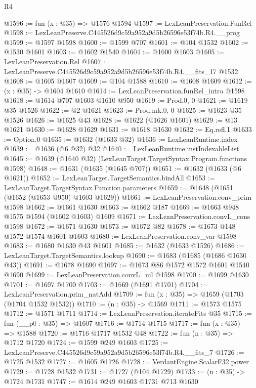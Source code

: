 \begin{lexlean}{R4}
\begin{coremodule}
@1596 := fun (x : @35) => @1576 @1594
@1597 := LexLeanPreservation.FunRel
@1598 := LexLeanPreserve.C445526d9c59a952a9d5b26596e53f74b.R4.__prog
@1599 := @1597 @1598
@1600 := @1599 @707
@1601 := @104 @1532
@1602 := @1530 @1601
@1603 := @1602 @1540
@1604 := @1600 @1603
@1605 := LexLeanPreservation.Rel
@1607 := LexLeanPreserve.C445526d9c59a952a9d5b26596e53f74b.R4.__fits_17 @1532
@1608 := @1605 @1607
@1609 := @104 @1588
@1610 := @1608 @1609
@1612 := (x : @35) -> @1604 @1610
@1614 := LexLeanPreservation.funRel_intro @1598
@1618 := @1614 @707 @1603 @1610 @950
@1619 := Prod.{0, 0}
@1621 := @1619 @35 @1526
@1622 := @2 @1621
@1623 := Prod.mk.{0, 0}
@1625 := @1623 @35 @1526
@1626 := @1625 @43
@1628 := @1622 (@1626 @1601)
@1629 := @13 @1621
@1630 := @1628 @1629
@1631 := @1618 @1630
@1632 := Eq.refl.{1}
@1633 := Option.{0}
@1635 := @1632 (@1633 @32)
@1636 := LexLeanRuntime.index
@1639 := @1636 (@6 @32) @32
@1640 := LexLeanRuntime.instIndexableList
@1645 := @1639 (@1640 @32) (LexLeanTarget.TargetSyntax.Program.functions @1598)
@1648 := @1631 (@1635 (@1645 @707))
@1651 := @1632 (@1633 (@6 @1621))
@1652 := LexLeanTarget.TargetSemantics.bindAll
@1653 := LexLeanTarget.TargetSyntax.Function.parameters
@1659 := @1648 (@1651 (@1652 (@1653 @950) @1603 @1629))
@1661 := LexLeanPreservation.conv_prim @1598
@1662 := @1661 @1630
@1663 := @1662 @187
@1669 := @1663 @948 @1575 @1594 (@1602 @1603) @1609
@1671 := LexLeanPreservation.convL_cons @1598
@1672 := @1671 @1630
@1673 := @1672 @82
@1678 := @1673 @148 @1572 @1574 @1601 @1603
@1680 := LexLeanPreservation.conv_var @1598
@1683 := @1680 @1630 @43 @1601
@1685 := @1632 (@1633 @1526)
@1686 := LexLeanTarget.TargetSemantics.lookup
@1690 := @1683 (@1685 (@1686 @1630 @43))
@1691 := @1678 @1690
@1697 := @1673 @86 @1572 @1572 @1601 @1540 @1690
@1699 := LexLeanPreservation.convL_nil @1598
@1700 := @1699 @1630
@1701 := @1697 @1700
@1703 := @1669 (@1691 @1701)
@1704 := LexLeanPreservation.prim_natAdd
@1709 := fun (x : @35) => @1659 (@1703 (@1704 @1532 @1532))
@1710 := (n : @35) -> @1569
@1711 := @1573 @1575
@1712 := @1571 @1711
@1714 := LexLeanPreservation.iterateFits @35
@1715 := fun (__p0 : @35) => @1607
@1716 := @1714 @1715
@1717 := fun (x : @35) => @1588
@1720 := @1716 @1717 @1532 @48
@1722 := fun (n : @35) => @1712 @1720
@1724 := @1599 @249 @1603
@1725 := LexLeanPreserve.C445526d9c59a952a9d5b26596e53f74b.R4.__fits_7
@1726 := @1725 @1532
@1727 := @1605 @1726
@1728 := VerdantEngine.ScalarF32.power
@1729 := @1728 @1532
@1731 := @1727 (@104 @1729)
@1733 := (n : @35) -> @1724 @1731
@1747 := @1614
    @249
    @1603
    @1731
    @713
    @1630

\end{coremodule}
\end{lexlean}
